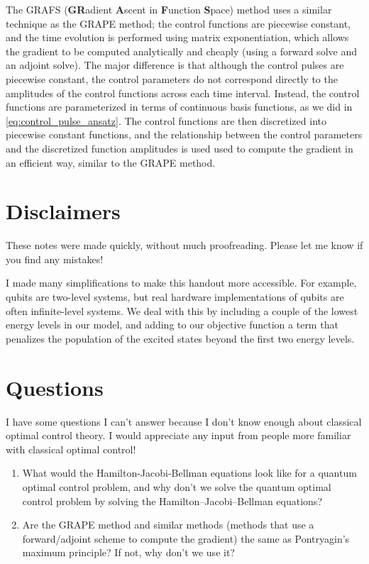\documentclass[letterpaper]{tufte-handout}
\begin{document}
The GRAFS (\textbf{GR}adient \textbf{A}scent in \textbf{F}unction \textbf{S}pace) method\cite{Lucarelli_2018} uses a similar technique as the GRAPE method; the control functions are piecewise constant, and the time evolution is performed using matrix exponentiation, which allows the gradient to be computed analytically and cheaply (using a forward solve and an adjoint solve). The major difference is that although the control pulses are piecewise constant, the control parameters do not correspond directly to the amplitudes of the control functions across each time interval. Instead, the control functions are parameterized in terms of continuous basis functions, as we did in \eqref{eq:control_pulse_ansatz}. The control functions are then discretized into piecewise constant functions, and the relationship between the control parameters and the discretized function amplitudes is used used to compute the gradient in an efficient way, similar to the GRAPE method.
\section{Disclaimers}
These notes were made quickly, without much proofreading. Please let me know if you find any mistakes!

I made many simplifications to make this handout more accessible. For example, qubits are two-level systems, but real hardware implementations of qubits are often infinite-level systems. We deal with this by including a couple of the lowest energy levels in our model, and adding to our objective function a term that penalizes the population of the excited states beyond the first two energy levels.


\section{Questions}
I have some questions I can't answer because I don't know enough about classical optimal control theory. I would appreciate any input from people more familiar with classical optimal control!
\begin{enumerate}
    \item What would the Hamilton-Jacobi-Bellman equations look like for a quantum optimal control problem, and why don't we solve the quantum optimal control problem by solving the Hamilton–Jacobi–Bellman equations?
    \item Are the GRAPE method and similar methods (methods that use a forward/adjoint scheme to compute the gradient) the same as Pontryagin's maximum principle? If not, why don't we use it?
\end{enumerate}




\end{document}
